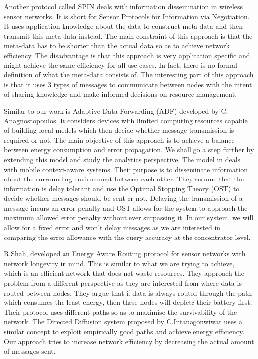 \documentclass{mproj}
\begin{document}
Another protocol called SPIN \cite{adaptiveProtocols} deals with information dissemination in wireless sensor networks. It is short for Sensor Protocols for Information via Negotiation. It uses application knowledge about the data to construct meta-data and then transmit this meta-data instead. The main constraint of this approach is that the meta-data has to be shorter than the actual data so as to achieve network efficiency. The disadvantage is that this approach is very application specific and might achieve the same efficiency for all use cases. In fact, there is no formal definition of what the meta-data consists of. The interesting part of this approach is that it uses 3 types of messages to communicate between nodes with the intent of sharing knowledge and make informed decisions on resource management.

Similar to our work is Adaptive Data Forwarding (ADF) \cite{adaptiveDataForwarding} developed by C. Anagnostopoulos. It considers devices with limited computing resources capable of building local models which then decide whether message transmission is required or not. The main objective of this approach is to achieve a balance between energy consumption and error propagation. We shall go a step further by extending this model and study the analytics perspective. The model in \cite{timeOptimizedContextual} deals with mobile context-aware systems. Their purpose is to disseminate information about the surrounding environment between each other. They assume that the information is delay tolerant and use the Optimal Stopping Theory (OST) to decide whether messages should be sent or not. Delaying the transmission of a message incurs an error penalty and OST allows for the system to approach the maximum allowed error penalty without ever surpassing it. In our system, we will allow for a fixed error and won't delay messages as we are interested in comparing the error allowance with the query accuracy at the concentrator level.

R.Shah, developed an Energy Aware Routing protocol \cite{energyAwareRouting} for sensor networks with network longevity in mind. This is similar to what we are trying to achieve, which is an efficient network that does not waste resources. They approach the problem from a different perspective as they are interested from where data is routed between nodes. They argue that if data is always routed through the path which consumes the least energy, then these nodes will deplete their battery first. Their protocol uses different paths so as to maximise the survivability of the network. The Directed Diffusion \cite{directedDiffusion} system proposed by C.Intanagonwiwat uses a similar concept to exploit empirically good paths and achieve energy efficiency. Our approach tries to increase network efficiency by decreasing the actual amount of messages sent.
\end{document}
